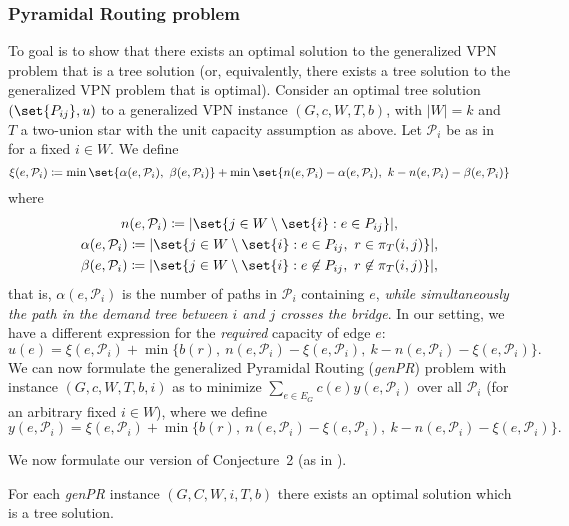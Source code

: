 \subsubsection{Pyramidal Routing problem}
To goal is to show that there exists an optimal solution to the generalized VPN problem that is a tree solution (or, equivalently, there exists a tree solution to the generalized VPN problem that is optimal).
Consider an optimal tree solution $(\set{P_{ij}}, u)$ to a generalized VPN instance $(G, c, W, T, b)$, with $|W| = k$ and $T$ a two-union star with the unit capacity assumption as above.
Let $\mathcal P_i$ be as in \cite{grandoni2008short} for a fixed $i \in W$.
We define
\[
    \xi(e, \mathcal P_i) \coloneqq \min\set{\alpha(e, \mathcal P_i),\ \beta(e, \mathcal P_i)} + \min\set{n(e, \mathcal P_i) - \alpha(e, \mathcal P_i),\ k - n(e, \mathcal P_i) - \beta(e, \mathcal P_i)}
\]
where
\begin{gather*}
    n(e, \mathcal P_i) \coloneqq |\set{j \in W \setminus \set{i} : e \in P_{ij}}|,\\
    \alpha(e, \mathcal P_i) \coloneqq |\set{j \in W \setminus \set{i} : e \in P_{ij},\ r \in \pi_T(i, j)}|,\\
    \beta(e, \mathcal P_i) \coloneqq |\set{j \in W \setminus \set{i} : e \not\in P_{ij},\ r \not\in \pi_T(i, j)}|,
\end{gather*}
that is, $\alpha(e, \mathcal P_i)$ is the number of paths in $\mathcal P_i$ containing $e$, \emph{while simultaneously the path in the demand tree between $i$ and $j$ crosses the bridge}.
In our setting, we have a different expression for the \emph{required} capacity of edge $e$:
\[
    u(e) = \xi(e, \mathcal P_i) + \min\Big\{b(r),\ n(e, \mathcal P_i) - \xi(e, \mathcal P_i),\ k - n(e, \mathcal P_i) -  \xi(e, \mathcal P_i)\Big\}.
\]
We can now formulate the generalized Pyramidal Routing (\emph{genPR}) problem with instance $(G, c, W, T, b, i)$ as to minimize $\sum_{e \in E_G} c(e) y(e, \mathcal P_i)$ over all $\mathcal P_i$ (for an arbitrary fixed $i \in W$), where we define
\[
    y(e, \mathcal P_i) = \xi(e, \mathcal P_i) + \min\Big\{b(r),\ n(e, \mathcal P_i) - \xi(e, \mathcal P_i),\ k - n(e, \mathcal P_i) -  \xi(e, \mathcal P_i)\Big\}.
\]

We now formulate our version of Conjecture~2 (as in \cite{grandoni2008short}).
\renewcommand\theconjecture{2}
\begin{conjecture}
    For each \emph{genPR} instance $(G, C, W, i, T, b)$ there exists an optimal solution which is a tree solution.
\end{conjecture}

